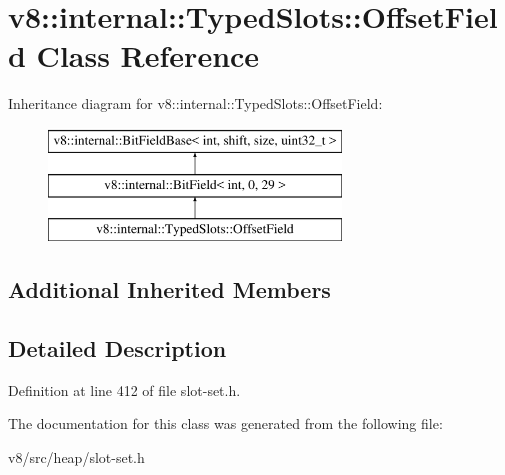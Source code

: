 \hypertarget{classv8_1_1internal_1_1TypedSlots_1_1OffsetField}{}\section{v8\+:\+:internal\+:\+:Typed\+Slots\+:\+:Offset\+Field Class Reference}
\label{classv8_1_1internal_1_1TypedSlots_1_1OffsetField}
Inheritance diagram for v8\+:\+:internal\+:\+:Typed\+Slots\+:\+:Offset\+Field\+:\begin{figure}[H]
\begin{center}
\leavevmode
\includegraphics[height=3.000000cm]{classv8_1_1internal_1_1TypedSlots_1_1OffsetField}
\end{center}
\end{figure}
\subsection*{Additional Inherited Members}


\subsection{Detailed Description}


Definition at line 412 of file slot-\/set.\+h.



The documentation for this class was generated from the following file\+:\begin{DoxyCompactItemize}
\item 
v8/src/heap/slot-\/set.\+h\end{DoxyCompactItemize}
